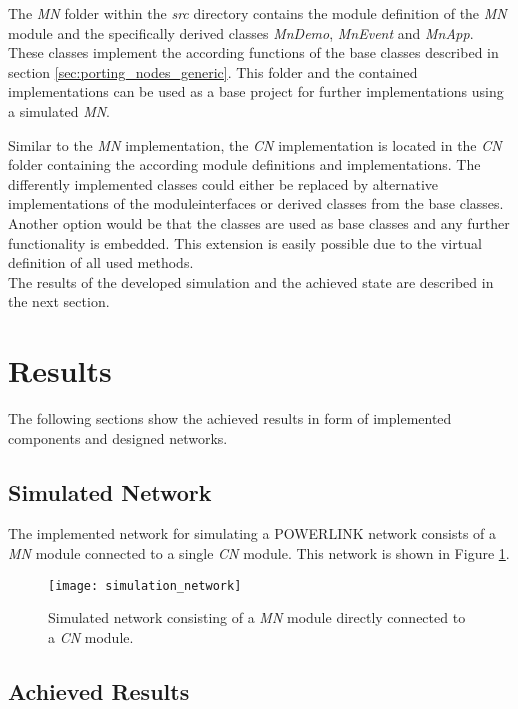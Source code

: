 The \emph{MN} folder within the \emph{src} directory contains the module definition of the \emph{MN} module and the specifically derived classes \emph{MnDemo}, \emph{MnEvent} and \emph{MnApp}.
These classes implement the according functions of the base classes described in section \ref{sec:porting_nodes_generic}.
This folder and the contained implementations can be used as a base project for further implementations using a simulated \emph{MN}.

Similar to the \emph{MN} implementation, the \emph{CN} implementation is located in the \emph{CN} folder containing the according module definitions and implementations.
The differently implemented classes could either be replaced by alternative implementations of the moduleinterfaces or derived classes from the base classes.
Another option would be that the classes are used as base classes and any further functionality is embedded.
This extension is easily possible due to the virtual definition of all used methods.
\\

The results of the developed simulation and the achieved state are described in the next section.

\section{Results}
\label{sec:porting_results}
The following sections show the achieved results in form of implemented components and designed networks.

\subsection{Simulated Network}
\label{sec:porting_results_network}
The implemented network for simulating a POWERLINK network consists of a \emph{MN} module connected to a single \emph{CN} module.
This network is shown in Figure \ref{fig:simulation_network}.

\begin{figure}
    \centering
    \texttt{[image: simulation\_network]}
    \caption{Simulated network consisting of a \emph{MN} module directly connected to a \emph{CN} module.}
    \label{fig:simulation_network}
\end{figure}

\subsection{Achieved Results}
\label{sec:porting_results_achieved}

